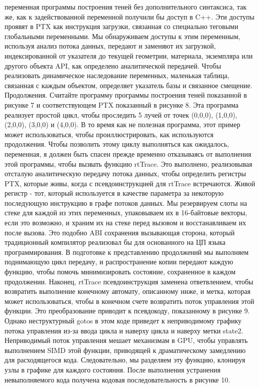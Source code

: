 переменная программы построения теней без дополнительного синтаксиса, так же, как к задействованной переменной получили бы доступ в C++. Эти доступы проявят в PTX как инструкция загрузки, связанная со специально теговыми глобальными переменными.
Мы обнаруживаем доступы к этим переменным, используя анализ потока данных, передают и заменяют их загрузкой, индексированной от указателя до текущей геометрии, материала, экземпляра или другого объекта API, как определено аналитической передачей. Чтобы реализовать динамическое наследование переменных, маленькая таблица, связанная с каждым объектом, определяет указатель базы и связанное смещение.
Продолжения. Считайте программу программы построения теней показанной в рисунке 7 и соответствующем PTX показанный в рисунке 8. Эта программа реализует простой цикл, чтобы проследить 5 лучей от точек (0,0,0), (1,0,0), (2,0,0), (3,0,0) и (4,0,0). В то время как не полезная программа, этот пример может использоваться, чтобы проиллюстрировать, как используются продолжения. Чтобы позволить этому циклу выполняться как ожидалось, переменная, я должен быть спасен прежде
временно отказываясь от выполнения этой программы, чтобы вызвать функцию rtTrace. Это выполнено, реализовывая отсталую аналитическую передачу потока данных, чтобы определить регистры PTX, которые живы, когда с псевдоинструкцией для rtTrace встречаются. Живой регистр - тот, который используется в качестве параметра за некоторую последующую инструкцию в графе потоков данных. Мы резервируем слоты на стеке для каждой из этих переменных, упаковываем их в 16-байтовые векторы, если это возможно, и храним их на стеке перед вызовом и восстанавливаем их после вызова. Это подобно ABI сохранения вызывающая сторона, который традиционный компилятор реализовал бы для основанного на ЦП языка программирования. В подготовке к представлению продолжений мы выполняем поднимающую цикл передачу, и распространение копии передают каждую функцию, чтобы помочь минимизировать состояние, сохраненное в каждом продолжении. Наконец, rtTrace псевдоинструкция заменена ответвлением, чтобы возвратить выполнение конечному автомату, описанному ниже, и метка, которая может использоваться, чтобы в конечном счете возвратить поток управления этой функции. Это преобразование приводит к псевдокоду, показанному в рисунке 9.
Однако неструктурный gotos в этом коде приведет к неприводимому графику потока управления из-за ввода цикла и наверху цикла и наверху метки state2.
Неприводимый поток управления мешает механизмам в GPU, чтобы управлять выполнением SIMD этой функции, приводящей к драматическому замедлению для расходящегося кода. Следовательно, мы разделяем эту функцию, клонируя узлы в графике для каждого состояния. После выполнения устранения невыполняемого кода получена кодовая последовательность в рисунке 10.
